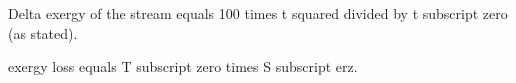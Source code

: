 Delta exergy of the stream equals 100 times t squared divided by t subscript zero (as stated).  

exergy loss equals T subscript zero times S subscript erz.